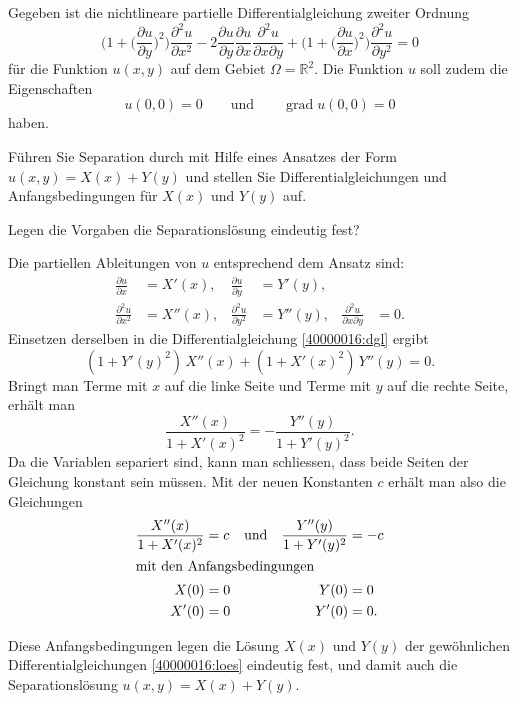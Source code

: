 Gegeben ist die nichtlineare partielle Differentialgleichung 
zweiter Ordnung
\begin{equation}
\biggl(1+\biggl(\frac{\partial u}{\partial y}\biggr)^2\biggr)
\frac{\partial^2 u}{\partial x^2}
-2
\frac{\partial u}{\partial y}
\frac{\partial u}{\partial x}
\frac{\partial^2 u}{\partial x\partial y}
+
\biggl(1+\biggl(\frac{\partial u}{\partial x}\biggr)^2\biggr)
\frac{\partial^2 u}{\partial y^2}
=0
\label{40000016:dgl}
\end{equation}
für die Funktion $u(x,y)$ auf dem Gebiet $\Omega =\mathbb R^2$.
Die Funktion $u$ soll zudem die Eigenschaften
\[
u(0,0)=0
\qquad\text{und}\qquad
\operatorname{grad} u(0,0)=0
\]
haben.
\begin{teilaufgaben}
\item
Führen Sie Separation durch mit Hilfe eines Ansatzes der Form
$
u(x,y) = X(x) + Y(y)
$
und stellen Sie Differentialgleichungen und Anfangsbedingungen
für $X(x)$ und $Y(y)$ auf.
\item
Legen die Vorgaben die Separationslösung eindeutig fest?
\end{teilaufgaben}

\begin{loesung}
\begin{teilaufgaben}
\item
Die partiellen Ableitungen von $u$ entsprechend dem Ansatz sind:
\begin{equation*}
\begin{aligned}
\frac{\partial u}{\partial x}
&=
X'(x),
&
\frac{\partial u}{\partial y}
&=
Y'(y),
\\
\frac{\partial^2 u}{\partial x^2}
&=
X''(x),
&
\frac{\partial^2 u}{\partial y^2}
&=
Y''(y),
&
\frac{\partial^2 u}{\partial x\partial y}
&=
0.
\end{aligned}
\end{equation*}
Einsetzen derselben in die Differentialgleichung \eqref{40000016:dgl} 
ergibt
\begin{equation}
(1+Y'(y)^2)\, X''(x) + (1+X'(x)^2)\, Y''(y) = 0.
\end{equation}
Bringt man Terme mit $x$ auf die linke Seite und Terme mit $y$ auf die
rechte Seite, erhält man
\begin{equation}
\frac{X''(x)}{1+X'(x)^2}
=
-\frac{Y''(y)}{1+Y'(y)^2}.
\end{equation}
Da die Variablen separiert sind, kann man schliessen, dass beide Seiten
der Gleichung konstant sein müssen.
Mit der neuen Konstanten $c$ erhält man also die Gleichungen
\begin{align}
\frac{X''(x)}{1+X'(x)^2} &= c
&
&\text{und}&
\frac{Y''(y)}{1+Y'(y)^2} &= -c
\label{40000016:loes}
\\
\intertext{mit den Anfangsbedingungen}
X(0) &= 0
&&&
Y(0) &= 0
\notag
\\
X'(0) &= 0
&&&
Y'(0) &= 0.
\notag
\end{align}
\item
Diese Anfangsbedingungen legen die Lösung $X(x)$ und $Y(y)$
der gewöhnlichen Differentialgleichungen
\eqref{40000016:loes}
eindeutig
fest, und damit auch die Separationslösung $u(x,y)=X(x) + Y(y)$.
\qedhere
\end{teilaufgaben}
\end{loesung}

